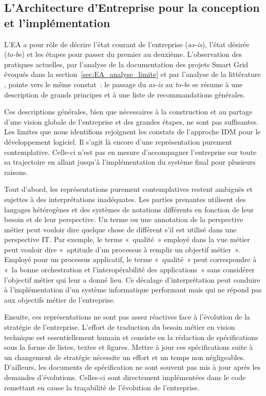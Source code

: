 	\subsection{L'Architecture d'Entreprise pour la conception et l'implémentation}

 L'EA a pour rôle de décrire l'état courant de l'entreprise (\textit{as-is}),
l'état désirée (\textit{to-be}) et les étapes pour passer du premier au
deuxième. L'observation des pratiques actuelles, par l'analyse de la
documentation des projets Smart Grid évoqués dans la
section~\ref{sec:EA_analyse_limite} et par l'analyse de la littérature , pointe
vers le même constat~: le passage du \textit{as-is} au \textit{to-be} se résume
à une description de grands principes et à une liste de recommandations
générales.

 Ces descriptions générales, bien que nécessaires à la construction et au
partage d'une vision globale de l'entreprise et des grandes étapes, ne sont pas
suffisantes. Les limites que nous identifions rejoignent les constats de
l'approche IDM pour le développement logiciel. Il s'agit là encore d'une
représentation purement contemplative. Celle-ci n'est pas en mesure
d'accompagner l'entreprise sur toute sa trajectoire en allant jusqu'à
l'implémentation du système final pour plusieurs raisons.

 Tout d'abord, les représentations purement contemplatives restent ambiguës
et sujettes à des interprétations inadéquates. Les parties prenantes utilisent
des langages hétérogènes et des systèmes de notations différents en fonction de
leur besoin et de leur perspective. Un terme ou une annotation de la
perspective métier peut vouloir dire quelque chose de différent s'il est
utilisé dans une perspective IT. Par exemple, le terme «~qualité~» employé dans
la vue métier peut vouloir dire «~aptitude d'un processus à remplir un objectif
métier~». Employé pour un processus applicatif, le terme «~qualité~» peut
correspondre à «~la bonne orchestration et l'interopérabilité des
applications~» sans considérer l'objectif métier qui leur a donné lieu. Ce
décalage d'interprétation peut conduire à l'implémentation d'un système
informatique performant mais qui ne répond pas aux objectifs métier de
l'entreprise.

Ensuite, ces représentations ne sont pas assez réactives face à l'évolution
de la stratégie de l'entreprise. L'effort de traduction du besoin métier en
vision technique est essentiellement humain et consiste en la rédaction de
spécifications sous la forme de listes, textes et figures. Mettre à jour ces
spécifications suite à un changement de stratégie nécessite un effort et un
temps non négligeables. D'ailleurs, les documents de spécification ne sont
souvent pas mis à jour après les demandes d'évolutions. Celles-ci sont
directement implémentées dans le code remettant en cause la traçabilité de
l'évolution de l'entreprise.

